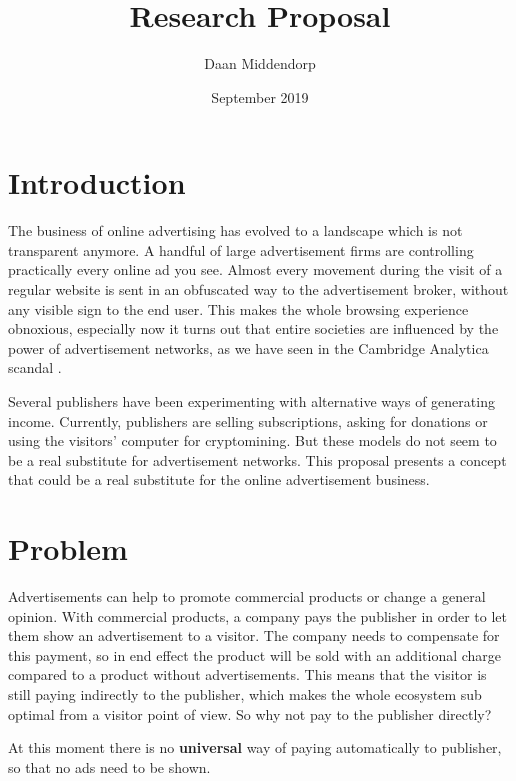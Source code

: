 \documentclass[a4paper]{article}
\title{Research Proposal}
\author{Daan Middendorp}
\date{September 2019}
\begin{document}
\maketitle

\section{Introduction}
The business of online advertising has evolved to a landscape which is not transparent anymore. A handful of large advertisement firms are controlling practically every online ad you see. Almost every movement during the visit of a regular website is sent in an obfuscated way to the advertisement broker, without any visible sign to the end user. This makes the whole browsing experience obnoxious, especially now it turns out that entire societies are influenced by the power of advertisement networks, as we have seen in the Cambridge Analytica scandal .

Several publishers have been experimenting with alternative ways of generating income. Currently, publishers are selling subscriptions, asking for donations or using the visitors' computer for cryptomining. But these models do not seem to be a real substitute for advertisement networks. This proposal presents a concept that could be a real substitute for the online advertisement business.

\section{Problem}
Advertisements can help to promote commercial products or change a general opinion. With commercial products, a company pays the publisher in order to let them show an advertisement to a visitor. The company needs to compensate for this payment, so in end effect the product will be sold with an additional charge compared to a product without advertisements. This means that the visitor is still paying indirectly to the publisher, which makes the whole ecosystem sub optimal from a visitor point of view. So why not pay to the publisher directly?

At this moment there is no \textbf{universal} way of paying automatically to publisher, so that no ads need to be shown.
\end{document}
